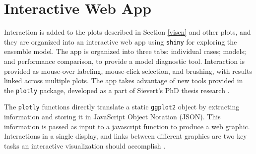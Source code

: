 \documentclass[10pt, legalpaper, twoside]{article}\usepackage[]{graphicx}\usepackage[]{color}
\begin{document}
% 
% 
% 
% 
% 

\section{Interactive Web App }\label{app}

 Interaction is added to the plots described in Section \ref{visen} and other plots, and they are organized into an interactive web app using \texttt{shiny} \cite{chang11shiny} for exploring the ensemble model. The app is organized into three tabs: individual cases; models; and performance comparison, to provide a model diagnostic tool. Interaction is provided as mouse-over labeling, mouse-click selection, and brushing, with results linked across multiple plots. The app takes advantage of new tools provided in the \texttt{plotly} \cite{plotly} package, developed as a part of Sievert's PhD thesis research \cite{sievertthesis}.

The \texttt{plotly} functions directly translate a static \texttt{ggplot2} object by  extracting  information  and  storing it in JavaScript Object Notation (JSON). This information is passed as input to a javascript function to produce a web graphic.  Interactions in a single display, and links between different graphics are two key tasks an interactive visualization should accomplish \cite{xie2014reactive}.
\end{document}
